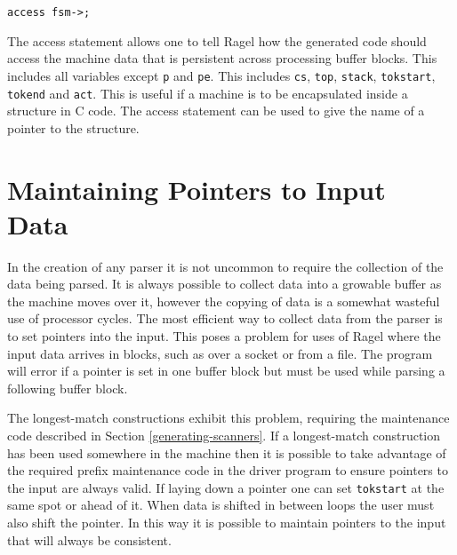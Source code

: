 \documentclass[letterpaper,11pt,oneside]{book}
\newcommand{\verbspace}{\vspace{10pt}}
\begin{document}
\begin{verbatim}
access fsm->;
\end{verbatim}
\verbspace

The access statement allows one to tell Ragel how the generated code should
access the machine data that is persistent across processing buffer blocks.
This includes all variables except \verb|p| and \verb|pe|. This includes
\verb|cs|, \verb|top|, \verb|stack|, \verb|tokstart|, \verb|tokend| and \verb|act|.
This is useful if a machine is to be encapsulated inside a
structure in C code. The access statement can be used to give the name of
a pointer to the structure.

\section{Maintaining Pointers to Input Data}

In the creation of any parser it is not uncommon to require the collection of
the data being parsed.  It is always possible to collect data into a growable
buffer as the machine moves over it, however the copying of data is a somewhat
wasteful use of processor cycles. The most efficient way to collect data
from the parser is to set pointers into the input. This poses a problem for
uses of Ragel where the input data arrives in blocks, such as over a socket or
from a file. The program will error if a pointer is set in one buffer block but
must be used while parsing a following buffer block.

The longest-match constructions exhibit this problem, requiring the maintenance
code described in Section \ref{generating-scanners}. If a longest-match
construction has been used somewhere in the machine then it is possible to
take advantage of the required prefix maintenance code in the driver program to
ensure pointers to the input are always valid. If laying down a pointer one can
set \verb|tokstart| at the same spot or ahead of it. When data is shifted in
between loops the user must also shift the pointer.  In this way it is possible
to maintain pointers to the input that will always be consistent.
\end{document}
